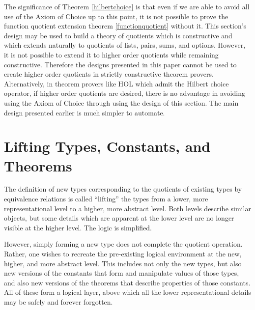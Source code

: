 \documentclass[envcountsame,runningheads]{llncs}
\begin{document}
\vspace{2.0mm}
The significance of Theorem \ref{hilbertchoice}
is that even if we are able to avoid all use of the Axiom of Choice up to
this point, it is not possible to prove the function quotient extension
theorem \ref{functionquotient} without it.
This section's design may be used
to build a theory of quotients which is constructive and which extends
naturally to quotients of lists, pairs, sums, and options.
However, it is not possible
to extend it to higher order quotients while remaining constructive.
Therefore
the designs presented in this paper cannot be used to create higher order
quotients in strictly constructive theorem provers.
Alternatively, in theorem
provers like HOL which admit the Hilbert choice operator,
if higher order quotients are desired,
there is no advantage in avoiding using the Axiom of Choice
through using the design of this section.
The main design presented earlier is much simpler to automate.


\vfill
\pagebreak[4]
%
\section{Lifting Types, Constants, and Theorems}
%
\label{liftingall}

The definition of new types corresponding to the quotients of
existing types by equivalence relations is called ``lifting''
the types from a lower, more representational level to a higher,
more abstract level.  Both levels describe similar objects, but
some details which are apparent at the lower level are no longer
visible at the higher level.  The logic is simplified.

However, simply forming a new type does not complete the quotient operation.
Rather, one wishes to recreate the
pre-existing logical environment at the new,
higher, and more abstract level.  This includes not only the new
types, but also new versions of the constants that form and
manipulate values of those types, and also new versions of the
theorems that describe properties of those constants.  All of these
form a logical layer, above which all the lower representational details
may be safely and forever forgotten.

%
\end{document}
